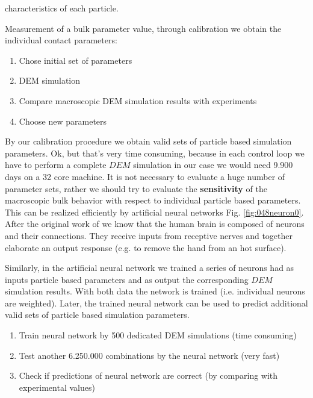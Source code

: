 characteristics of each particle.

Measurement of a bulk parameter value, through calibration we obtain the
individual contact parameters:
\begin{enumerate}
\item{Chose initial set of parameters}
\item{DEM simulation}
\item{Compare macroscopic DEM simulation results with experiments}
\item{Choose new parameters}
\end{enumerate}
By our calibration procedure we obtain valid sets of particle based simulation parameters.
Ok, but that's very time consuming, because in each control loop we have to
perform a complete $DEM$ simulation in our case we would need 9.900 days on a 32
core machine. It is not necessary to evaluate a huge number of parameter sets,
rather we should try to evaluate the \textbf{sensitivity} 
of the macroscopic bulk behavior with respect to individual particle based parameters.
This can be realized efficiently by artificial neural networks Fig.
\ref{fig:048neuron0}. 
After the original work of \citet{RefWorks:189} we know that the human brain is
composed of neurons and their connections. They receive inputs from receptive
nerves and together elaborate an output response (e.g. to remove the hand from
an hot surface).

Similarly, in the artificial neural network we trained a series of neurons had
as inputs particle based parameters and as output the corresponding $DEM$
simulation results.
With both data the network is trained (i.e. individual neurons are
weighted).
Later, the trained neural network can be used to predict additional valid sets of particle based simulation parameters. 

\begin{enumerate}
\item{Train neural network by 500 dedicated DEM simulations (time consuming)}
\item{Test another 6.250.000 combinations by the neural network (very fast)}
\item{Check if predictions of neural network are correct (by comparing with experimental  values)}
\end{enumerate}

